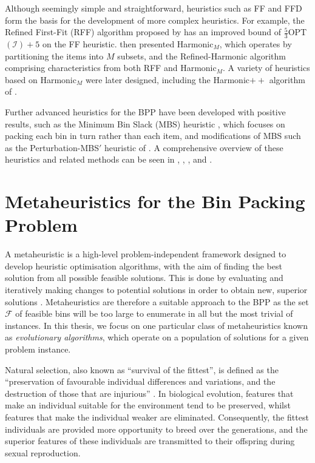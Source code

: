 \documentclass[a4paper,11pt]{article}
\begin{document}
Although seemingly simple and straightforward, heuristics such as FF and FFD form the basis for the development of more complex heuristics. For example, the Refined First-Fit (RFF) algorithm proposed by \citet{yao1980} has an improved bound of $\frac{5}{3}$OPT$(\mathcal{I}) + 5$ on the FF heuristic. \citet{lee1985} then presented Harmonic$_M$, which operates by partitioning the items into $M$ subsets, and the Refined-Harmonic algorithm comprising characteristics from both RFF and Harmonic$_M$. A variety of heuristics based on Harmonic$_M$ were later designed, including the Harmonic$++$ algorithm of \citet{seiden2002}. 

Further advanced heuristics for the BPP have been developed with positive results, such as the Minimum Bin Slack (MBS) heuristic \citep{gupta1999}, which focuses on packing each bin in turn rather than each item, and modifications of MBS such as the Perturbation-MBS$'$ heuristic of \citet{fleszar2002}. A comprehensive overview of these heuristics and related methods can be seen in \citet{johnson1973, johnson1974f}, \citet{johnson1974w}, \citet{garey1972}, and \citet{coffman1984, coffman1996, coffman1999, coffman2013}.


\section{Metaheuristics for the Bin Packing Problem}
\label{sec:metabpp}

\noindent A metaheuristic is a high-level problem-independent framework designed to develop heuristic optimisation algorithms, with the aim of finding the best solution from all possible feasible solutions. This is done by evaluating and iteratively making changes to potential solutions in order to obtain new, superior solutions \citep{sorensen2013}. Metaheuristics are therefore a suitable approach to the BPP as the set $\mathcal{F}$ of feasible bins will be too large to enumerate in all but the most trivial of instances. In this thesis, we focus on one particular class of metaheuristics known as \emph{evolutionary algorithms}, which operate on a population of solutions for a given problem instance. 

Natural selection, also known as ``survival of the fittest'', is defined as the ``preservation of favourable individual differences and variations, and the destruction of those that are injurious'' \citep{darwin1875}. In biological evolution, features that make an individual suitable for the environment tend to be preserved, whilst features that make the individual weaker are eliminated. Consequently, the fittest individuals are provided more opportunity to breed over the generations, and the superior features of these individuals are transmitted to their offspring during sexual reproduction.
\end{document}
